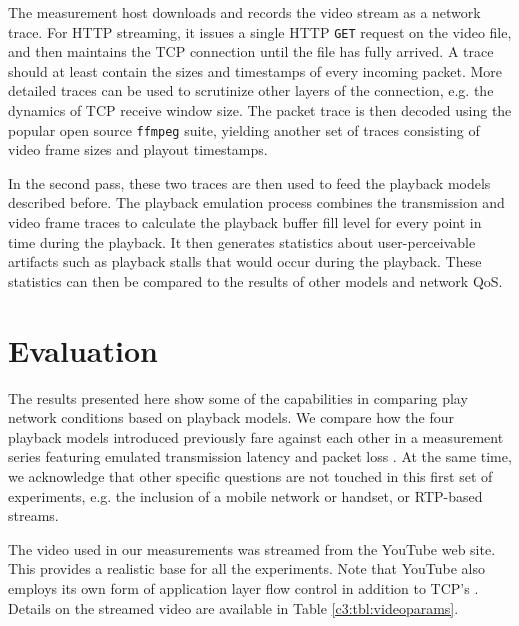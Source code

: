 The measurement host downloads and records the video stream as a network trace. For HTTP streaming, it issues a single HTTP \texttt{GET} request on the video file, and then maintains the TCP connection until the file has fully arrived. A trace should at least contain the sizes and timestamps of every incoming packet. More detailed traces can be used to scrutinize other layers of the connection, e.g. the dynamics of TCP receive window size. The packet trace is then decoded using the popular open source \texttt{ffmpeg} suite, yielding another set of traces consisting of video frame sizes and playout timestamps.

In the second pass, these two traces are then used to feed the playback models described before. The playback emulation process combines the transmission and video frame traces to calculate the playback buffer fill level for every point in time during the playback. It then generates statistics about user-perceivable artifacts such as playback stalls that would occur during the playback. These statistics can then be compared to the results of other models and network QoS.



\section{Evaluation}
\label{sec:evaluations}

The results presented here show some of the capabilities in comparing play network conditions based on playback models. We compare how the four playback models introduced previously fare against each other in a measurement series featuring  emulated transmission latency and packet loss . At the same time, we acknowledge that other specific questions are not touched in this first set of experiments, e.g. the inclusion of a mobile network or handset, or RTP-based streams.

The video used in our measurements was streamed from the YouTube web site. This provides a realistic base for all the experiments. Note that YouTube also employs its own form of application layer flow control in addition to TCP's \cite{alcock2011application}. %
Details on the streamed video are available in Table \ref{c3:tbl:videoparams}.

